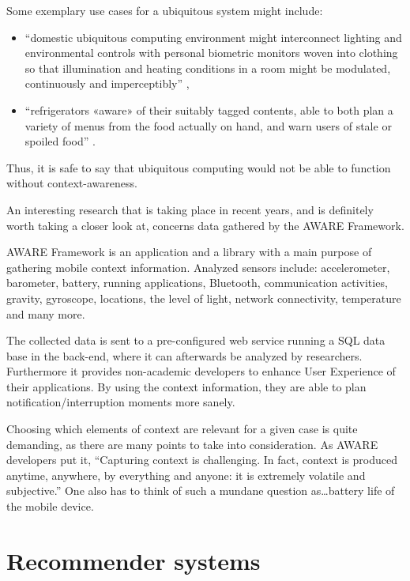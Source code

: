 Some exemplary use cases for a ubiquitous system might include:

\begin{itemize}
	\item ``domestic ubiquitous computing environment might interconnect lighting and environmental controls with personal biometric monitors woven into clothing so that illumination and heating conditions in a room might be modulated, continuously and imperceptibly'' \cite{wiki:ubiquitous},
	\item ``refrigerators «aware» of their suitably tagged contents, able to both plan a variety of menus from the food actually on hand, and warn users of stale or spoiled food'' \cite{wiki:ubiquitous}.
\end{itemize}

Thus, it is safe to say that ubiquitous computing would not be able to function without context-awareness.

An interesting research that is taking place in recent years, and is definitely worth taking a closer look at, concerns data gathered by the AWARE Framework.

AWARE Framework is an application and a library with a main purpose of gathering mobile context information. Analyzed sensors include: accelerometer, barometer, battery, running applications, Bluetooth, communication activities, gravity, gyroscope, locations, the level of light, network connectivity, temperature and many more. \cite{aware}

The collected data is sent to a pre-configured web service running a SQL data base in the back-end, where it can afterwards be analyzed by researchers. Furthermore it provides non-academic developers to enhance User Experience of their applications. By using the context information, they are able to plan notification/interruption moments more sanely. \cite{aware}

Choosing which elements of context are relevant for a given case is quite demanding, as there are many points to take into consideration. As AWARE developers put it, ``Capturing context is challenging. In fact, context is produced anytime, anywhere, by everything and anyone: it is extremely volatile and subjective.'' \cite{aware} One also has to think of such a mundane question as\ldots battery life of the mobile device.

\vspace{4cm}
\clearpage

\section{Recommender systems}

